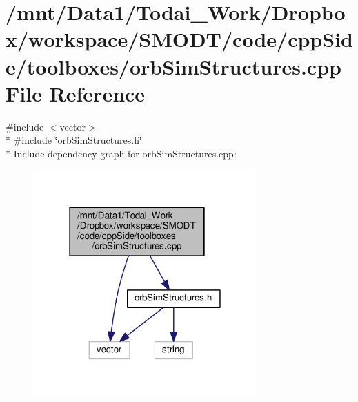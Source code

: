 \section{/mnt/\-Data1/\-Todai\-\_\-\-Work/\-Dropbox/workspace/\-S\-M\-O\-D\-T/code/cpp\-Side/toolboxes/orb\-Sim\-Structures.cpp File Reference}
\label{orb_sim_structures_8cpp}
{\ttfamily \#include $<$vector$>$}\\*
{\ttfamily \#include \char`\"{}orb\-Sim\-Structures.\-h\char`\"{}}\\*
Include dependency graph for orb\-Sim\-Structures.\-cpp\-:\nopagebreak
\begin{figure}[H]
\begin{center}
\leavevmode
\includegraphics[width=243pt]{orb_sim_structures_8cpp__incl}
\end{center}
\end{figure}
